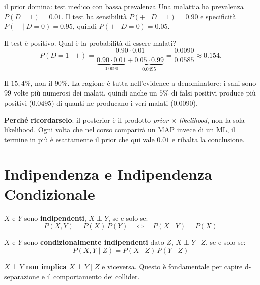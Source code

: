 \begin{esempiosvolto}{il prior domina: test medico con bassa prevalenza}
Una malattia ha prevalenza $P(D{=}1) = 0.01$. Il test ha sensibilità $P(+ \mid D{=}1) = 0.90$ e specificità $P(- \mid D{=}0) = 0.95$, quindi $P(+ \mid D{=}0) = 0.05$.

Il test è positivo. Qual è la probabilità di essere malati?
\[
P(D{=}1 \mid +) = \frac{0.90 \cdot 0.01}{\underbrace{0.90 \cdot 0.01}_{0.0090} + \underbrace{0.05 \cdot 0.99}_{0.0495}} = \frac{0.0090}{0.0585} \approx 0.154.
\]

Il $15{,}4\%$, non il $90\%$. La ragione è tutta nell'evidence a denominatore: i sani sono $99$ volte più numerosi dei malati, quindi anche un $5\%$ di falsi positivi produce più positivi ($0.0495$) di quanti ne producano i veri malati ($0.0090$).

\textbf{Perché ricordarselo}: il posterior è il prodotto \emph{prior $\times$ likelihood}, non la sola likelihood. Ogni volta che nel corso comparirà un MAP invece di un ML, il termine in più è esattamente il prior che qui vale $0.01$ e ribalta la conclusione.
\end{esempiosvolto}

\section{Indipendenza e Indipendenza Condizionale}

\begin{definition}
$X$ e $Y$ sono \textbf{indipendenti}, $X \perp Y$, se e solo se:
\[
P(X, Y) = P(X)\,P(Y) \quad \Leftrightarrow \quad P(X \mid Y) = P(X)
\]
\end{definition}

\begin{definition}
$X$ e $Y$ sono \textbf{condizionalmente indipendenti} dato $Z$, $X \perp Y \mid Z$, se e solo se:
\[
P(X, Y \mid Z) = P(X \mid Z)\,P(Y \mid Z)
\]
\end{definition}

\begin{tcolorbox}[title=Nota Importante]
$X \perp Y$ \textbf{non implica} $X \perp Y \mid Z$ e viceversa. Questo è fondamentale per capire d-separazione e il comportamento dei collider.
\end{tcolorbox}

